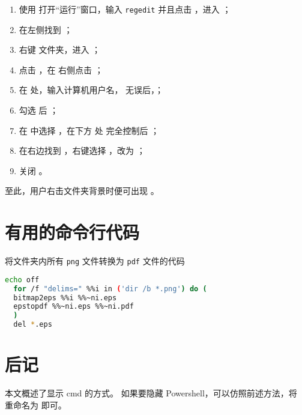 \documentclass{ctexart}
\begin{document}
\begin{enumerate}
  \item 使用  打开“运行”窗口，输入 \texttt{regedit} 并且点击 ，进入 ；
  \item 在左侧找到 ；
  \item 右键  文件夹，进入 ；
  \item 点击 ，在  右侧点击 ；
  \item 在  处，输入计算机用户名， 无误后，；
  \item 勾选  后 ；
  \item 在  中选择 ，在下方  处  完全控制后 ；
  \item 在右边找到 ，右键选择 ，改为 ；
  \item 关闭 。
\end{enumerate}
至此，用户右击文件夹背景时便可出现 。

\section{有用的命令行代码}

将文件夹内所有 \texttt{png} 文件转换为 \texttt{pdf} 文件的代码

\begin{lstlisting}[language = bash]
  echo off
  for /f "delims=" %%i in ('dir /b *.png') do (
  bitmap2eps %%i %%~ni.eps
  epstopdf %%~ni.eps %%~ni.pdf
  )
  del *.eps
\end{lstlisting}

\section{后记}

本文概述了显示 \textsf{cmd} 的方式。
如果要隐藏 \textsf{Powershell}，可以仿照前述方法，将  重命名为  即可。
\end{document}
